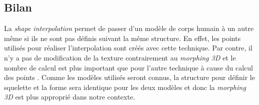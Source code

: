 \subsection{Bilan}
La \emph{shape interpolation} permet de passer d'un modèle de corps humain à un autre même si ils ne sont pas définis suivant la même structure. En effet, les points utilisés pour réaliser l'interpolation sont créés avec cette technique. Par contre, il n'y a pas de modification de la texture contrairement au \emph{morphing 3D} et le nombre de calcul est plus important que pour l'autre technique à cause du calcul des points . Comme les modèles utilisés seront connus, la structure pour définir le squelette et la forme sera identique pour les deux modèles et donc la \emph{morphing 3D} est plus approprié dans notre contexte.